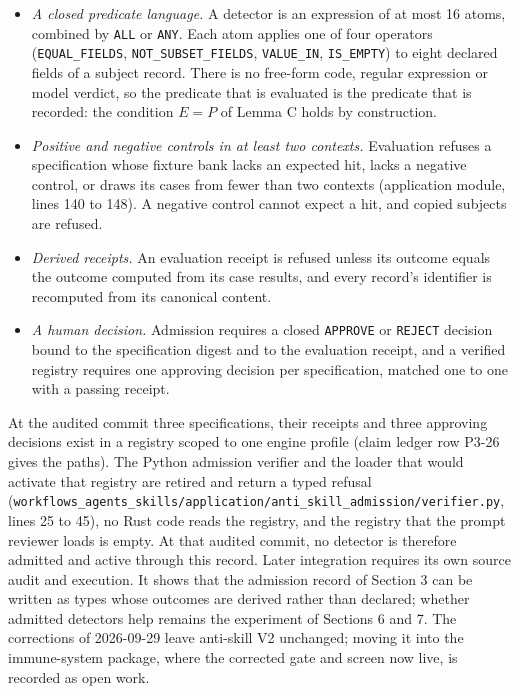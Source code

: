 \documentclass[
  11pt,
]{article}
\newcommand{\passthrough}[1]{#1}
\providecommand{\tightlist}{%
  \setlength{\itemsep}{0pt}\setlength{\parskip}{0pt}}
\begin{document}
\begin{itemize}
\tightlist
\item
  \emph{A closed predicate language.} A detector is an expression of at
  most 16 atoms, combined by \passthrough{\lstinline!ALL!} or
  \passthrough{\lstinline!ANY!}. Each atom applies one of four operators
  (\texttt{\nolinkurl{EQUAL_FIELDS}},
  \texttt{\nolinkurl{NOT_SUBSET_FIELDS}},
  \texttt{\nolinkurl{VALUE_IN}},
  \texttt{\nolinkurl{IS_EMPTY}}) to eight declared fields of a
  subject record. There is no free-form code, regular expression or
  model verdict, so the predicate that is evaluated is the predicate
  that is recorded: the condition \(E = P\) of Lemma C holds by
  construction.
\item
  \emph{Positive and negative controls in at least two contexts.}
  Evaluation refuses a specification whose fixture bank lacks an
  expected hit, lacks a negative control, or draws its cases from fewer
  than two contexts (application module, lines 140 to 148). A negative
  control cannot expect a hit, and copied subjects are refused.
\item
  \emph{Derived receipts.} An evaluation receipt is refused unless its
  outcome equals the outcome computed from its case results, and every
  record's identifier is recomputed from its canonical content.
\item
  \emph{A human decision.} Admission requires a closed
  \passthrough{\lstinline!APPROVE!} or \passthrough{\lstinline!REJECT!}
  decision bound to the specification digest and to the evaluation
  receipt, and a verified registry requires one approving decision per
  specification, matched one to one with a passing receipt.
\end{itemize}

At the audited commit three specifications, their receipts and three
approving decisions exist in a registry scoped to one engine profile
(claim ledger row P3-26 gives the paths). The Python admission verifier
and the loader that would activate that registry are retired and return
a typed refusal
(\texttt{\nolinkurl{workflows_agents_skills/application/anti_skill_admission/verifier.py}},
lines 25 to 45), no Rust code reads the registry, and the registry that
the prompt reviewer loads is empty. At that audited commit, no detector
is therefore admitted and active through this record. Later integration
requires its own source audit and execution. It shows that the admission
record of Section 3 can be written as types whose outcomes are derived
rather than declared; whether admitted detectors help remains the
experiment of Sections 6 and 7. The corrections of 2026-09-29 leave
anti-skill V2 unchanged; moving it into the immune-system package, where
the corrected gate and screen now live, is recorded as open work.
\end{document}
